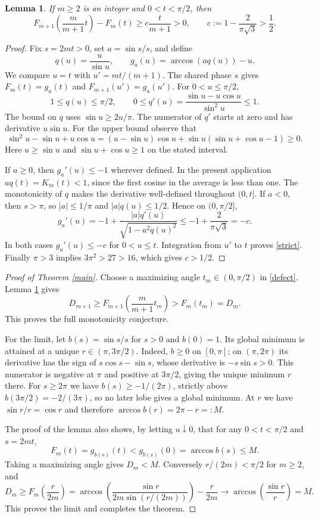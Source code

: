 \documentclass[11pt]{article}
\newtheorem{lemma}{Lemma}
\begin{document}
\begin{lemma}\label{comparison}
If $m\geq2$ is an integer and $0<t<\pi/2$, then
\begin{equation}\label{strict}
 F_{m+1}\left(\frac{m}{m+1}t\right)-F_m(t)
 \geq c\frac{t}{m+1}>0,
 \qquad c:=1-\frac2{\pi\sqrt3}>\frac12.
\end{equation}
\end{lemma}
\begin{proof}
Fix $s=2mt>0$, set $a=\sin s/s$, and define
\[
 q(u)=\frac{u}{\sin u},\qquad
 g_a(u)=\arccos(aq(u))-u.
\]
We compare $u=t$ with $u'=mt/(m+1)$. The shared phase $s$ gives
$F_m(t)=g_a(t)$ and $F_{m+1}(u')=g_a(u')$.
For $0<u\leq\pi/2$,
\begin{equation}\label{qbounds}
 1\leq q(u)\leq\pi/2,\qquad
 0\leq q'(u)=\frac{\sin u-u\cos u}{\sin^2u}\leq1.
\end{equation}
The bound on $q$ uses $\sin u\geq2u/\pi$.
The numerator of $q'$ starts at zero and has derivative $u\sin u$.
For the upper bound observe that
\[
 \sin^2u-\sin u+u\cos u
 =(u-\sin u)\cos u+
             \sin u(\sin u+\cos u-1)\geq0.
\]
Here $u\geq\sin u$ and $\sin u+\cos u\geq1$ on the stated interval.

If $a\geq0$, then $g_a'(u)\leq-1$ wherever defined. In the
present application $a q(t)=K_m(t)<1$, since the first cosine
in the average is less than one. The monotonicity of $q$ makes
the derivative well-defined throughout $(0,t]$.
If $a<0$, then $s>\pi$, so $|a|\leq1/\pi$ and
$|a|q(u)\leq1/2$. Hence on $(0,\pi/2]$,
\[
 g_a'(u)=-1+\frac{|a|q'(u)}{\sqrt{1-a^2q(u)^2}}
         \leq-1+\frac2{\pi\sqrt3}=-c.
\]
In both cases $g_a'(u)\leq-c$ for $0<u\leq t$.
Integration from $u'$ to $t$ proves \eqref{strict}.
Finally $\pi>3$ implies $3\pi^2>27>16$, which gives $c>1/2$.
\end{proof}

\begin{proof}[Proof of Theorem \ref{main}]
Choose a maximizing angle $t_m\in(0,\pi/2)$ in \eqref{defect}.
Lemma \ref{comparison} gives
\[
 D_{m+1}\geq F_{m+1}\left(\frac{m}{m+1}t_m\right)
            >F_m(t_m)=D_m.
\]
This proves the full monotonicity conjecture.

For the limit, let $b(s)=\sin s/s$ for $s>0$ and $b(0)=1$.
Its global minimum is attained at a unique $r\in(\pi,3\pi/2)$.
Indeed, $b\geq0$ on $[0,\pi]$; on $(\pi,2\pi)$ its derivative
has the sign of $s\cos s-\sin s$, whose derivative is
$-s\sin s>0$. This numerator is negative at $\pi$ and positive
at $3\pi/2$, giving the unique minimum $r$ there.
For $s\geq2\pi$ we have $b(s)\geq-1/(2\pi)$, strictly above
$b(3\pi/2)=-2/(3\pi)$, so no later lobe gives a global minimum.
At $r$ we have $\sin r/r=\cos r$ and therefore
$\arccos b(r)=2\pi-r=:M$.

The proof of the lemma also shows, by letting $u\downarrow0$,
that for any $0<t<\pi/2$ and $s=2mt$,
\[
 F_m(t)=g_{b(s)}(t)<g_{b(s)}(0)=\arccos b(s)\leq M.
\]
Taking a maximizing angle gives $D_m<M$.
Conversely $r/(2m)<\pi/2$ for $m\geq2$, and
\[
 D_m\geq F_m\left(\frac r{2m}\right)
 =\arccos\left(\frac{\sin r}{2m\sin(r/(2m))}\right)
       -\frac r{2m}\longrightarrow\arccos\left(\frac{\sin r}{r}\right)=M.
\]
This proves the limit and completes the theorem.
\end{proof}
\end{document}
